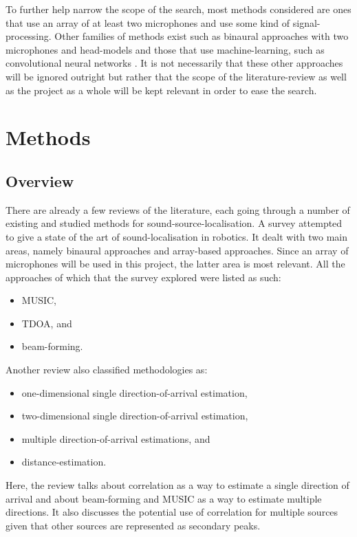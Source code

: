 \documentclass{report}
\begin{document}
To further help narrow the scope of the search, most methods considered are ones that use an array of at least two microphones and use some kind of signal-processing. Other families of methods exist such as binaural approaches with two microphones and head-models \cite{argentieri_survey_2015} and those that use machine-learning, such as convolutional neural networks \cite{sakavicius_multiple_2022}. It is not necessarily that these other approaches will be ignored outright but rather that the scope of the literature-review as well as the project as a whole will be kept relevant in order to ease the search.

\section{Methods}

\subsection{Overview}

There are already a few reviews of the literature, each going through a number of existing and studied methods for sound-source-localisation. A survey \cite{argentieri_survey_2015} attempted to give a state of the art of sound-localisation in robotics. It dealt with two main areas, namely binaural approaches and array-based approaches. Since an array of microphones will be used in this project, the latter area is most relevant. All the approaches of which that the survey explored were listed as such:
\begin{itemize}
	\item MUSIC,
	\item TDOA, and
	\item beam-forming.
\end{itemize}

Another review \cite{rascon_localization_2017} also classified methodologies as:
\begin{itemize}
	\item one-dimensional single direction-of-arrival estimation,
	\item two-dimensional single direction-of-arrival estimation,
	\item multiple direction-of-arrival estimations, and
	\item distance-estimation.
\end{itemize}
Here, the review talks about correlation as a way to estimate a single direction of arrival and about beam-forming and MUSIC as a way to estimate multiple directions. It also discusses the potential use of correlation for multiple sources given that other sources are represented as secondary peaks. 
\end{document}
